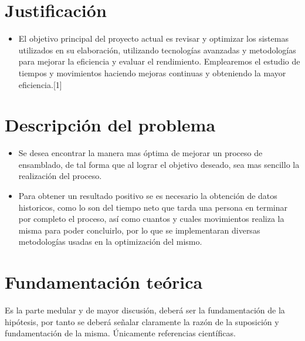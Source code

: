         
   
    
    \section{Justificación}

        \begin{itemize}
            \item El objetivo principal del proyecto actual es revisar y optimizar los sistemas utilizados en su elaboración, utilizando tecnologías avanzadas y metodologías  para mejorar la eficiencia y evaluar el rendimiento. Emplearemos el estudio de tiempos y movimientos haciendo mejoras continuas y obteniendo la mayor eficiencia.[1]
        \end{itemize}


    
    
    \section{Descripción del problema}
         \begin{itemize}
            \item Se desea encontrar la manera mas óptima de mejorar un proceso de ensamblado, de tal forma que al lograr el objetivo deseado, sea mas sencillo la realización del proceso. 
            \item Para obtener un resultado positivo se es necesario la obtención de datos historicos, como lo son del tiempo neto que tarda una persona en terminar por completo el proceso, así como cuantos y cuales movimientos realiza la misma para poder concluirlo, por lo que se implementaran diversas metodologías usadas en la optimización del mismo.  
        \end{itemize}
   
 
    \section{Fundamentación teórica}
    
        Es la parte medular y de mayor discusión, deberá ser la fundamentación de la hipótesis, por tanto se deberá señalar claramente la razón de la suposición y fundamentación de la misma. Únicamente referencias científicas.
    
